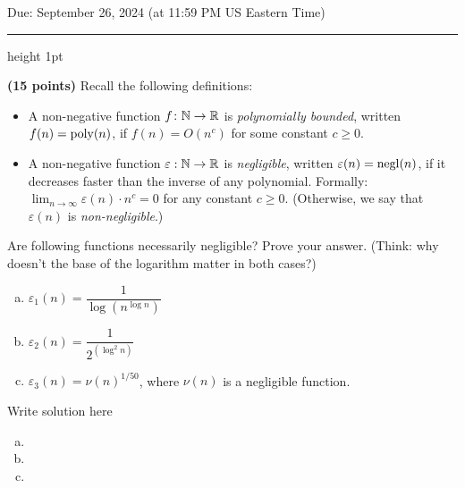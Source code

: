 \documentclass[12pt]{hw}
\begin{document}
\maketitle

\begin{center}
  Due: September 26, 2024 (at 11:59 PM US Eastern Time) \\[10pt]
  \hrule height 1pt
\end{center}


\begin{exercise}
    \textbf{(15 points)}
    Recall the following definitions:
	\begin{itemize}
		\item A non-negative function $f \colon \mathbb{N} \to \mathbb{R}$ is
		\emph{polynomially bounded}, written $f(n) = \operatorname{poly}(n)$, if
		$f(n) = O(n^{c})$ for some constant $c \geq 0$.
		\item A non-negative function $\varepsilon : \mathbb{N} \to \mathbb{R}$ is
		\emph{negligible}, written $\varepsilon(n) = \operatorname{negl}(n)$, if it
		decreases faster than the inverse of any polynomial.  Formally:
		$\lim_{n \to \infty} \varepsilon(n) \cdot n^{c} = 0$ for any
		constant $c \geq 0$.  (Otherwise, we say that $\varepsilon(n)$ is
		\emph{non-negligible}.)
	\end{itemize}
	
	Are following functions necessarily negligible? Prove your answer.
	(Think: why doesn't the base of the logarithm matter in both cases?)
 \begin{enumerate}[(a)]
		\item $\varepsilon_1(n) = \dfrac{1}{\log (n^{\log n})}$
		\item $\varepsilon_2(n) = \dfrac{1}{2^{(\log^{2} n)}}$
  \item $\varepsilon_3(n) = \nu(n)^{1/50}$, where $\nu(n)$ is a negligible function.
  \end{enumerate}
\end{exercise}
\begin{answer}
Write solution here
    \begin{enumerate}[(a)]
        \item
        \item
        \item
    \end{enumerate}
\end{answer}
\end{document}
